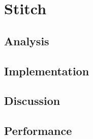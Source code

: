 \section{Stitch}
\subsection{Analysis} %
\subsection{Implementation} %
\subsection{Discussion} %
\subsection{Performance} %

